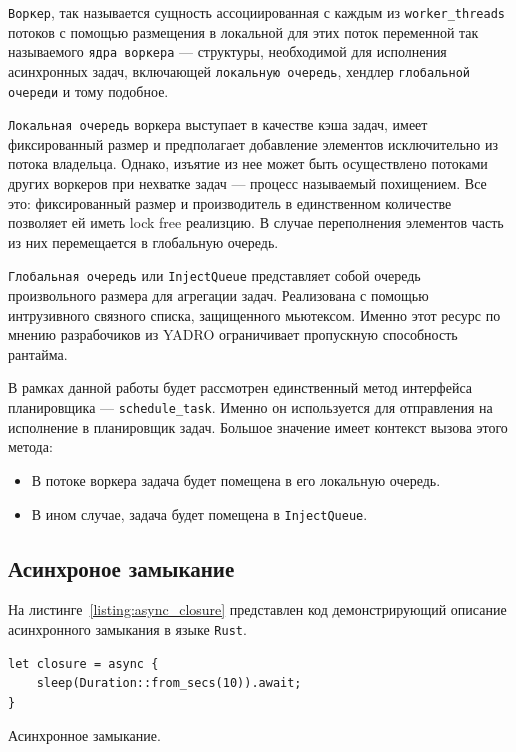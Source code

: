 \verb|Воркер|, так называется сущность ассоциированная с каждым из \verb|worker_threads| потоков с помощью размещения в локальной для этих поток переменной так называемого \verb|ядра воркера| --- структуры, необходимой для исполнения асинхронных задач, включающей \verb|локальную очередь|, хендлер \verb|глобальной очереди| и тому подобное.

\verb|Локальная очередь| воркера выступает в качестве кэша задач, имеет фиксированный размер и предполагает добавление элементов  исключительно из потока владельца. Однако, изъятие из нее может быть осуществлено потоками других воркеров при нехватке задач --- процесс называемый похищением. Все это: фиксированный размер и производитель в единственном количестве позволяет ей иметь lock free реализцию. В случае переполнения элементов часть из них перемещается в глобальную очередь.

\verb|Глобальная очередь| или \verb|InjectQueue| представляет собой очередь произвольного размера для агрегации задач. Реализована с помощью интрузивного связного списка, защищенного мьютексом. Именно этот ресурс по мнению разрабочиков из YADRO ограничивает пропускную способность рантайма.

В рамках данной работы будет рассмотрен единственный метод интерфейса планировщика --- \verb|schedule_task|. Именно он используется для отправления на исполнение в планировщик задач. Большое значение имеет контекст вызова этого метода:

\begin{itemize}
    \item В потоке воркера задача будет помещена в его локальную очередь.
    \item В ином случае, задача будет помещена в \verb|InjectQueue|.
\end{itemize}

\subsection{Асинхроное замыкание}

На листинге~\ref{listing:async_closure} представлен код демонстрирующий описание асинхронного замыкания в языке \verb|Rust|.

\begin{listing}[H]
    \begin{verbatim}
let closure = async {
    sleep(Duration::from_secs(10)).await;
}
    \end{verbatim}

    \caption{Асинхронное замыкание.}
    \label{listing:async_closure}
\end{listing}

